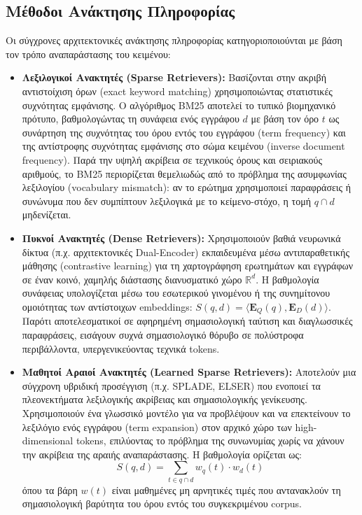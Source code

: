 \subsection{Μέθοδοι Ανάκτησης Πληροφορίας}

Οι σύγχρονες αρχιτεκτονικές ανάκτησης πληροφορίας κατηγοριοποιούνται με βάση τον τρόπο αναπαράστασης του κειμένου:

\begin{itemize}
    \item \textbf{Λεξιλογικοί Ανακτητές (Sparse Retrievers):} Βασίζονται στην ακριβή αντιστοίχιση όρων (exact keyword matching) χρησιμοποιώντας στατιστικές συχνότητας εμφάνισης. Ο αλγόριθμος BM25 αποτελεί το τυπικό βιομηχανικό πρότυπο, βαθμολογώντας τη συνάφεια ενός εγγράφου $d$ με βάση τον όρο $t$ ως συνάρτηση της συχνότητας του όρου εντός του εγγράφου (term frequency) και της αντίστροφης συχνότητας εμφάνισης στο σώμα κειμένου (inverse document frequency). Παρά την υψηλή ακρίβεια σε τεχνικούς όρους και σειριακούς αριθμούς, το BM25 περιορίζεται θεμελιωδώς από το πρόβλημα της ασυμφωνίας λεξιλογίου (vocabulary mismatch): αν το ερώτημα χρησιμοποιεί παραφράσεις ή συνώνυμα που δεν συμπίπτουν λεξιλογικά με το κείμενο-στόχο, η τομή $q \cap d$ μηδενίζεται.
    \item \textbf{Πυκνοί Ανακτητές (Dense Retrievers):} Χρησιμοποιούν βαθιά νευρωνικά δίκτυα (π.χ. αρχιτεκτονικές Dual-Encoder) εκπαιδευμένα μέσω αντιπαραθετικής μάθησης (contrastive learning) για τη χαρτογράφηση ερωτημάτων και εγγράφων σε έναν κοινό, χαμηλής διάστασης διανυσματικό χώρο $\mathbb{R}^d$. Η βαθμολογία συνάφειας υπολογίζεται μέσω του εσωτερικού γινομένου ή της συνημίτονου ομοιότητας των αντίστοιχων embeddings: $S(q, d) = \langle \mathbf{E}_Q(q), \mathbf{E}_D(d) \rangle$. Παρότι αποτελεσματικοί σε αφηρημένη σημασιολογική ταύτιση και διαγλωσσικές παραφράσεις, εισάγουν συχνά σημασιολογικό θόρυβο σε πολύστροφα περιβάλλοντα, υπεργενικεύοντας τεχνικά tokens.
    \item \textbf{Μαθητοί Αραιοί Ανακτητές (Learned Sparse Retrievers):} Αποτελούν μια σύγχρονη υβριδική προσέγγιση (π.χ. SPLADE, ELSER) που ενοποιεί τα πλεονεκτήματα λεξιλογικής ακρίβειας και σημασιολογικής γενίκευσης. Χρησιμοποιούν ένα γλωσσικό μοντέλο για να προβλέψουν και να επεκτείνουν το λεξιλόγιο ενός εγγράφου (term expansion) στον αρχικό χώρο των high-dimensional tokens, επιλύοντας το πρόβλημα της συνωνυμίας χωρίς να χάνουν την ακρίβεια της αραιής αναπαράστασης. Η βαθμολογία ορίζεται ως:
    \begin{equation}
    S(q, d) = \sum_{t \in q \cap d} w_q(t) \cdot w_d(t)
    \end{equation}
    όπου τα βάρη $w(t)$ είναι μαθημένες μη αρνητικές τιμές που αντανακλούν τη σημασιολογική βαρύτητα του όρου εντός του συγκεκριμένου corpus.
\end{itemize}

